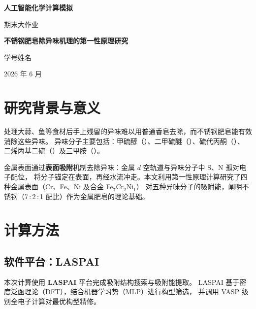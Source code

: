 \documentclass[12pt, a4paper]{article}
\begin{document}

\begin{titlepage}
  \centering
  \vspace*{4cm}
  {\Huge\bfseries 人工智能化学计算模拟}\par
  \vspace{1cm}
  {\LARGE 期末大作业}\par
  \vspace{2cm}
  {\Large\bfseries 不锈钢肥皂除异味机理的第一性原理研究}\par
  \vspace{3cm}
  {\large 学号姓名}\par
  \vspace{0.5cm}
  {\large 2026 年 6 月}\par
  \vfill
\end{titlepage}

\newpage

\section{研究背景与意义}

处理大蒜、鱼等食材后手上残留的异味难以用普通香皂去除，而不锈钢肥皂能有效消除这些异味。
异味分子主要包括：甲硫醇（）、二甲硫醚（）、硫代丙酮（）、
二烯丙基二硫（）及三甲胺（）。

金属表面通过\textbf{表面吸附}机制去除异味：金属 $d$ 空轨道与异味分子中 S、N 孤对电子配位，
将分子锚定在表面，再经水流冲走。本文利用第一性原理计算研究了四种金属表面（Cr、Fe、Ni 及合金 Fe$_7$Cr$_2$Ni$_1$）
对五种异味分子的吸附能，阐明不锈钢（7\,:\,2\,:\,1 配比）作为金属肥皂的理论基础。

\section{计算方法}

\subsection{软件平台：LASPAI}

本次计算使用 \textbf{LASPAI} 平台完成吸附结构搜索与吸附能提取。
LASPAI 基于密度泛函理论（DFT），结合机器学习势（MLP）进行构型筛选，
并调用 \textsc{VASP} 级别全电子计算对最优构型精修。
\end{document}

